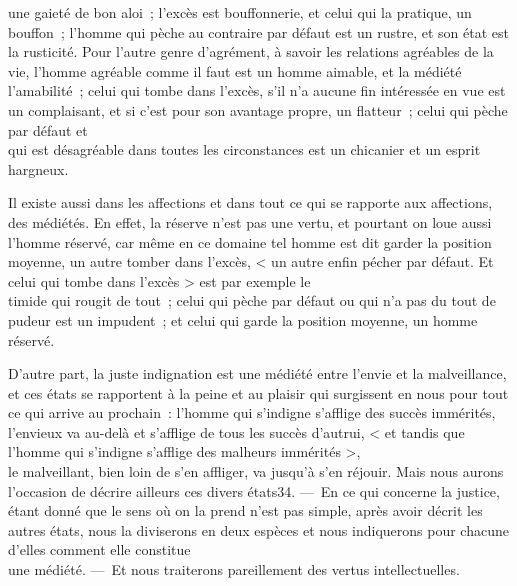 \documentclass[french,twoside]{book} %
\begin{document}
une gaieté de bon aloi ; l’excès est bouffonnerie, et celui qui la pratique, un bouffon ; l’homme qui pèche au contraire par défaut est un rustre, et son état est la rusticité. Pour l’autre genre d’agrément, à savoir les relations agréables de la vie, l’homme agréable comme il faut est un homme aimable, et la médiété l’amabilité ; celui qui tombe dans l’excès, s’il n’a aucune fin intéressée en vue est un complaisant, et si c’est pour son avantage propre, un flatteur ; celui qui pèche par défaut et \\
qui est désagréable dans toutes les circonstances est un chicanier et un esprit hargneux.\par
Il existe aussi dans les affections et dans tout ce qui se rapporte aux affections, des médiétés. En effet, la réserve n’est pas une vertu, et pourtant on loue aussi l’homme réservé, car même en ce domaine tel homme est dit garder la position moyenne, un autre tomber dans l’excès, < un autre enfin pécher par défaut. Et celui qui tombe dans l’excès > est par exemple le \\
timide qui rougit de tout ; celui qui pèche par défaut ou qui n’a pas du tout de pudeur est un impudent ; et celui qui garde la position moyenne, un homme réservé.\par
 D’autre part, la juste indignation est une médiété entre l’envie et la malveillance, et ces états se rapportent à la peine et au plaisir qui surgissent en nous pour tout ce qui arrive au prochain : l’homme qui s’indigne s’afflige des succès immérités, l’envieux va au-delà et s’afflige de tous les succès d’autrui, < et tandis que l’homme qui s’indigne s’afflige des malheurs immérités >, \\
le malveillant, bien loin de s’en affliger, va jusqu’à s’en réjouir. Mais nous aurons l’occasion de décrire ailleurs ces divers états34. — En ce qui concerne la justice, étant donné que le sens où on la prend n’est pas simple, après avoir décrit les autres états, nous la diviserons en deux espèces et nous indiquerons pour chacune d’elles comment elle constitue \\
une médiété. — Et nous traiterons pareillement des vertus intellectuelles.
\end{document}
